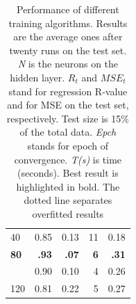 \documentclass[a4paper, 10pt]{article}
\begin{document}
\begin{table}[h!]
\begin{tabular}{@{}lrrrr@{}}
    40  & 0.85    & 0.13   & 11       & 0.18  \\ 
    \textbf{80} & \textbf{.93} & \textbf{.07}  & \textbf{6} & \textbf{.31} \\
    \hdashline
   100  & 0.90    & 0.10   & 4        & 0.26  \\
   120  & 0.81    & 0.22   & 5        & 0.27  \\  
    \bottomrule
  \end{tabular} \mbox{}
  \caption{Performance of different training algorithms. Results are the
    average ones after twenty runs on the test set. \emph{N} is the
    neurons on the hidden layer. $R_t$ and $MSE_t$ 
  stand for regression R-value and for MSE on the test set, respectively. 
  Test size is 15\% of the total data. \emph{Epch} stands for epoch of 
  convergence. \emph{T(s)} is time (seconds). Best result is 
  highlighted in bold. The dotted line separates overfitted results}
  \label{tab:train_algs}
\end{table}
\end{document}
